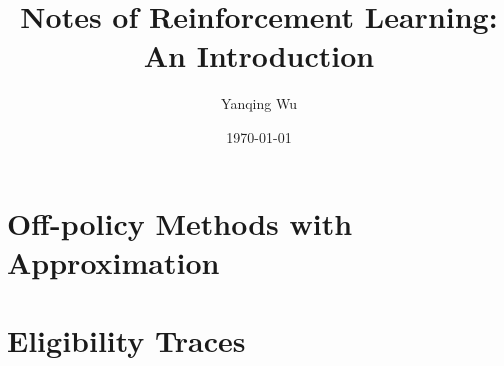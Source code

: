 \documentclass[lang=en,mode=geye,device=normal,color=blue,14pt]{elegantnote}
\title{Notes of Reinforcement Learning: An Introduction}
\author{Yanqing Wu}
\date{\today}
\DeclareMathOperator*{\1}{\mathbbm{1}}
\begin{document}
\maketitle

\setlength{\parindent}{0pt}
\tableofcontents





























\newpage
\section{Off-policy Methods with Approximation}

\newpage
\section{Eligibility Traces}








\end{document}
